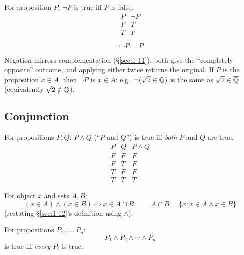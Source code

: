 \documentclass[11pt]{article}
\begin{document}
\begin{definition}[Negation]
For proposition $P$, $\neg P$ is true iff $P$ is false.
\[
\begin{array}{c|c}
P & \neg P \\ \hline
F & T \\
T & F
\end{array}
\]
\end{definition}

\begin{theorem}
\[
\neg\neg P = P.
\]
\end{theorem}

\begin{note}
Negation mirrors complementation (\S\ref{sec:1-11}): both give the ``completely opposite'' outcome, and applying either twice returns the original. If $P$ is the proposition $x \in A$, then $\neg P$ is $x \in \overline{A}$: e.g.\ $\neg(\sqrt2 \in \mathbb{Q})$ is the same as $\sqrt2 \in \overline{\mathbb{Q}}$ (equivalently $\sqrt2 \notin \mathbb{Q}$).
\end{note}

\subsection{Conjunction}
\label{sec:4-6}

\begin{definition}[Conjunction]
For propositions $P,Q$: $P \wedge Q$ (``$P$ and $Q$'') is true iff \emph{both} $P$ and $Q$ are true.
\[
\begin{array}{cc|c}
P & Q & P \wedge Q \\ \hline
F & F & F \\
F & T & F \\
T & F & F \\
T & T & T
\end{array}
\]
\end{definition}

\begin{note}
For object $x$ and sets $A,B$:
\[
(x \in A) \wedge (x \in B) \iff x \in A \cap B, \qquad A \cap B = \{x : x\in A \wedge x \in B\}
\]
(restating \S\ref{sec:1-12}'s definition using $\wedge$).
\end{note}

\begin{definition}
For propositions $P_1,\dots,P_n$:
\[
P_1 \wedge P_2 \wedge \cdots \wedge P_n
\]
is true iff \emph{every} $P_i$ is true.
\end{definition}
\end{document}
